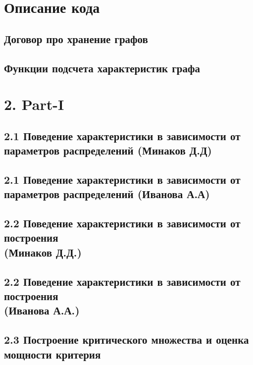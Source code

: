 \documentclass[12pt]{article}
\begin{document}
\section{Описание кода}

\subsection{Договор про хранение графов}

    
\subsection{Функции подсчета характеристик графа}

\newpage
\section*{2. Part-I}

\subsection*{2.1 Поведение характеристики в зависимости от параметров распределений (Минаков Д.Д)}

\newpage

\subsection*{2.1 Поведение характеристики в зависимости от параметров распределений (Иванова А.А)}

\newpage

\subsection*{2.2 Поведение характеристики в зависимости от построения\\ (Минаков Д.Д.)}

\newpage

\subsection*{2.2 Поведение характеристики в зависимости от построения \\(Иванова А.А.)}

\newpage

\subsection*{2.3 Построение критического множества и оценка мощности критерия}
\end{document}
